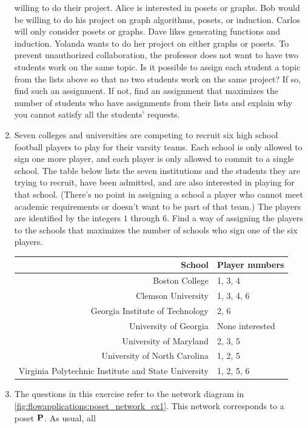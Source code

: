 \begin{enumerate}
  willing to do their project. Alice is interested in posets or
  graphs. Bob would be willing to do his project on graph algorithms,
  posets, or induction. Carlos will only consider posets or
  graphs. Dave likes generating functions and induction. Yolanda wants to
  do her project on either graphs or posets.  To prevent unauthorized
  collaboration, the professor does not want to have two students work
  on the same topic. Is it possible to assign each student a topic
  from the lists above so that no two students work on the same
  project? If so, find such an assignment. If not, find an assignment
  that maximizes the number of students who have assignments from
  their lists and explain why you cannot satisfy all the students'
  requests.
\item Seven colleges and universities are competing to recruit six
  high school football players to play for their varsity teams. Each
  school is only allowed to sign one more player, and each player is
  only allowed to commit to a single school. The table below lists the
  seven institutions and the students they are trying to recruit, have
  been admitted, and are also interested in playing for that
  school. (There's no point in assigning a school a player who cannot
  meet academic requirements or doesn't want to be part of that team.)
  The players are identified by the integers $1$ through $6$.  Find a
  way of assigning the players to the schools that maximizes the
  number of schools who sign one of the six players.
  \begin{center}
    \begin{tabular}{r|l}
      School & Player numbers\\\hline
      Boston College & 1, 3, 4\\
      Clemson University & 1, 3, 4, 6\\
      Georgia Institute of Technology & 2, 6\\
      University of Georgia & None interested\\
      University of Maryland & 2, 3, 5\\
      University of North Carolina & 1, 2, 5\\
      Virginia Polytechnic Institute and State University & 1, 2, 5, 6
    \end{tabular}
  \end{center}
\item The questions in this exercise refer to the network diagram in
  \autoref{fig:flowapplications:poset_network_ex1}. This network
  corresponds to a poset $\mathbf{P}$. As usual, all

\end{enumerate}
